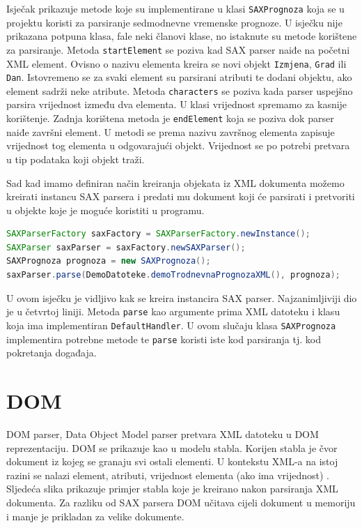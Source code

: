 \documentclass{foi}
\begin{document}
Isječak prikazuje metode koje su implementirane u klasi \texttt{SAXPrognoza} koja se u
projektu koristi za parsiranje sedmodnevne vremenske prognoze. U isječku nije prikazana
potpuna klasa, fale neki članovi klase, no istaknute su metode korištene za parsiranje.
Metoda \texttt{startElement} se poziva kad SAX parser naiđe na početni XML element. Ovisno
o nazivu elementa kreira se novi objekt \texttt{Izmjena}, \texttt{Grad} ili \texttt{Dan}. Istovremeno se za svaki
element su parsirani atributi te dodani objektu, ako element sadrži neke atribute. Metoda
\texttt{characters} se poziva kada parser uspejšno parsira vrijednost između dva elementa.
U klasi vrijednost spremamo za kasnije korištenje. Zadnja korištena metoda je \texttt{endElement}
koja se poziva dok parser naiđe završni element. U metodi se prema nazivu završnog elementa
zapisuje vrijednost tog elementa u odgovarajući objekt. Vrijednost se po potrebi pretvara
u tip podataka koji objekt traži.

Sad kad imamo definiran način kreiranja objekata iz XML dokumenta možemo kreirati instancu
SAX parsera i predati mu dokument koji će parsirati i pretvoriti u objekte koje je moguće
koristiti u programu.

\begin{lstlisting}[language=java, caption={Kreiranje instance SAX parsera i parsiranje XML datoteke}]
SAXParserFactory saxFactory = SAXParserFactory.newInstance();
SAXParser saxParser = saxFactory.newSAXParser();
SAXPrognoza prognoza = new SAXPrognoza();
saxParser.parse(DemoDatoteke.demoTrodnevnaPrognozaXML(), prognoza);
\end{lstlisting}

U ovom isječku je vidljivo kak se kreira instancira SAX parser. Najzanimljiviji dio
je u četvrtoj liniji. Metoda \texttt{parse} kao argumente prima XML datoteku i klasu
koja ima implementiran \texttt{DefaultHandler}. U ovom slučaju klasa \texttt{SAXPrognoza}
implementira potrebne metode te \texttt{parse} koristi iste kod parsiranja tj. kod
pokretanja događaja.

\section{DOM}
DOM parser, Data Object Model parser pretvara XML datoteku u DOM reprezentaciju.
DOM se prikazuje kao u modelu stabla. Korijen stabla je čvor dokument iz kojeg se
granaju svi ostali elementi. U kontekstu XML-a na istoj razini se nalazi element,
atributi, vrijednost elementa (ako ima vrijednost) \cite{java_and_xml}. Sljedeća slika prikazuje primjer
stabla koje je kreirano nakon parsiranja XML dokumenta. Za razliku od SAX parsera
DOM učitava cijeli dokument u memoriju i manje je prikladan za velike dokumente.
\end{document}
